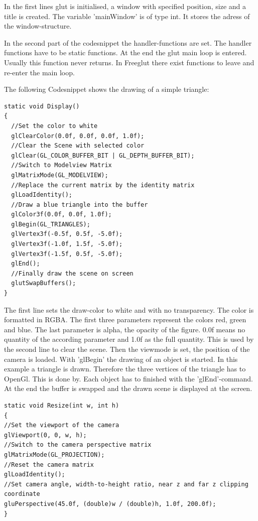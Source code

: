 \documentclass[10pt,a4paper,DIV=11]{scrreprt}
\begin{document}
In the first lines glut is initialised, a window with specified position, size and a title is created.
The variable 'mainWindow' is of type int. It stores the adress of the window-structure.

In the second part of the codesnippet the handler-functions are set. The handler functions have to be static functions.
At the end the glut main loop is entered. Usually this function never returns. In Freeglut there exist functions to leave and re-enter the main loop.

The following Codesnippet shows the drawing of a simple triangle:

\begin{lstlisting}[caption={Drawing some graphics},label=lst:glut-draw]
static void Display()
{
  //Set the color to white
  glClearColor(0.0f, 0.0f, 0.0f, 1.0f);
  //Clear the Scene with selected color
  glClear(GL_COLOR_BUFFER_BIT | GL_DEPTH_BUFFER_BIT);
  //Switch to Modelview Matrix
  glMatrixMode(GL_MODELVIEW);
  //Replace the current matrix by the identity matrix
  glLoadIdentity();
  //Draw a blue triangle into the buffer
  glColor3f(0.0f, 0.0f, 1.0f);
  glBegin(GL_TRIANGLES);
  glVertex3f(-0.5f, 0.5f, -5.0f);
  glVertex3f(-1.0f, 1.5f, -5.0f);
  glVertex3f(-1.5f, 0.5f, -5.0f);
  glEnd();
  //Finally draw the scene on screen
  glutSwapBuffers();
}
\end{lstlisting}

The first line sets the draw-color to white and with no transparency. The color is formatted in RGBA. The first three parameters represent the colors red, green and blue. The last parameter is alpha, the opacity of the figure. 0.0f means no quantity of the according parameter and 1.0f as the full quantity.
 This is used by the second line to clear the scene.
Then the viewmode is set, the position of the camera is loaded.
With 'glBegin' the drawing of an object is started. In this example a triangle is drawn. Therefore the three vertices of the triangle has to OpenGl. This is done by. Each object has to finished with the 'glEnd'-command.
At the end the buffer is swapped and the drawn scene is displayed at the screen.

\begin{lstlisting}[caption={Resize camera perspective on window resize},label=lst:glut-resize]
static void Resize(int w, int h)
{
//Set the viewport of the camera
glViewport(0, 0, w, h);
//Switch to the camera perspective matrix
glMatrixMode(GL_PROJECTION); 
//Reset the camera matrix
glLoadIdentity();
//Set camera angle, width-to-height ratio, near z and far z clipping coordinate
gluPerspective(45.0f, (double)w / (double)h, 1.0f, 200.0f);
}
\end{lstlisting}
\end{document}

